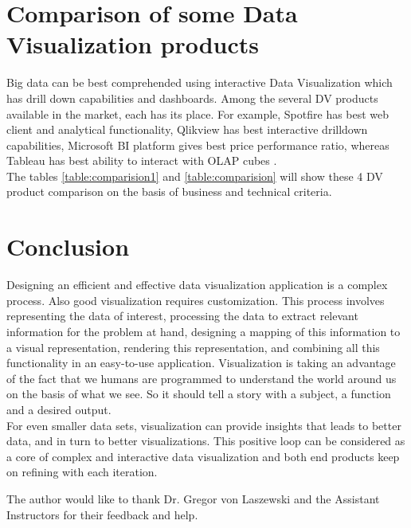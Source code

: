 \section{Comparison of some Data Visualization products}

Big data can be best comprehended using interactive Data Visualization which has drill down capabilities and dashboards. Among the several DV products available in the market, each has its place. For example, Spotfire has best web client and analytical functionality, Qlikview has best interactive drilldown capabilities, Microsoft BI platform gives best price performance ratio, whereas Tableau has best ability to interact with OLAP cubes \cite{compare}.\\ The tables \ref{table:comparision1} and \ref{table:comparision} will show these 4 DV product comparison on the basis of business and technical criteria.


\section{Conclusion}

Designing an efficient and effective data visualization application is a complex process. Also good visualization requires customization. This process involves representing the data of interest, processing the data to extract relevant information for the problem at hand, designing a mapping of this information to a visual representation, rendering this representation, and combining all this functionality in an easy-to-use application. Visualization is taking an advantage of the fact that we humans are programmed to understand the world around us on the basis of what we see. So it should tell a story with a subject, a function and a desired output.\\

For even smaller data sets, visualization can provide insights that leads to better data, and in turn to better visualizations. This positive loop can be considered as a core of complex and interactive data visualization and both end products keep on refining with each iteration. 


\begin{acks}

  The author would like to thank Dr. Gregor von Laszewski and the Assistant Instructors for their feedback and help.
\end{acks}


 



